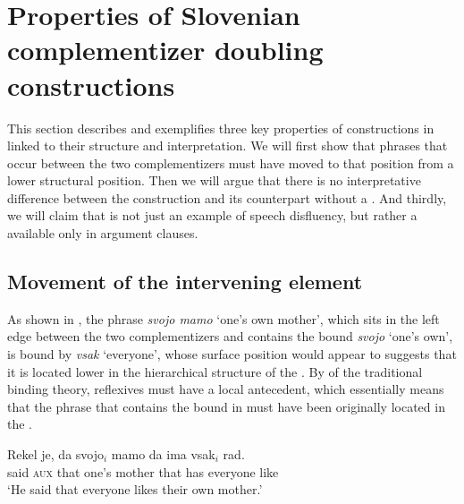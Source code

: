 \documentclass[output=paper,colorlinks,citecolor=brown]{langsci/langscibook}
\begin{document}
\section{Properties of Slovenian complementizer doubling constructions}\label{sec:plesnicar:s2}
This section describes and exemplifies three key properties of  constructions in  linked to their structure and interpretation. We will first show that phrases that occur between the two complementizers must have moved to that position from a lower structural position. Then we will argue that there is no interpretative difference between the  construction and its counterpart without a  . And thirdly, we will claim that   is not just an example of speech disfluency, but rather a  available only in argument clauses.

\subsection{Movement of the intervening element} \label{s21}

As shown in , the phrase \textit{svojo mamo} `one’s own mother', which sits in the left edge between the two complementizers and contains the bound   \textit{svojo} `one’s own', is bound by \textit{vsak} `everyone', whose surface position would appear to suggests that it is located lower in the hierarchical structure of the . By  of the traditional binding theory, reflexives must have a local antecedent, which essentially means that the phrase that contains the bound  in  must have been originally located in the  \citep{chomsky1981}.

\begin{exe}
\ex \label{ex:plesnicar:four}
\gll Rekel	je,	da	svojo$_i$	mamo		da	ima	vsak$_i$		rad. \\
	said	\textsc{aux}	that	one’s	mother		that	has	everyone	like\\
\trans `He said that everyone likes their own mother.'
\end{exe}
\end{document}
